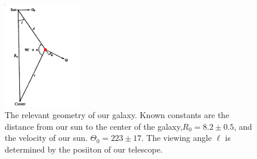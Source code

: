 \begin{figure}
  \includegraphics[width=0.3\textwidth]{geom}
  \caption{The relevant geometry of our galaxy. Known constants are the distance from our sun to the center of the galaxy,$R_0 = 8.2 \pm 0.5$, and the velocity of our sun. $\Theta_0 = 223 \pm 17$. The viewing angle $\ell$ is determined by the posiiton of our telescope.}
  \label{geom}
\end{figure}

